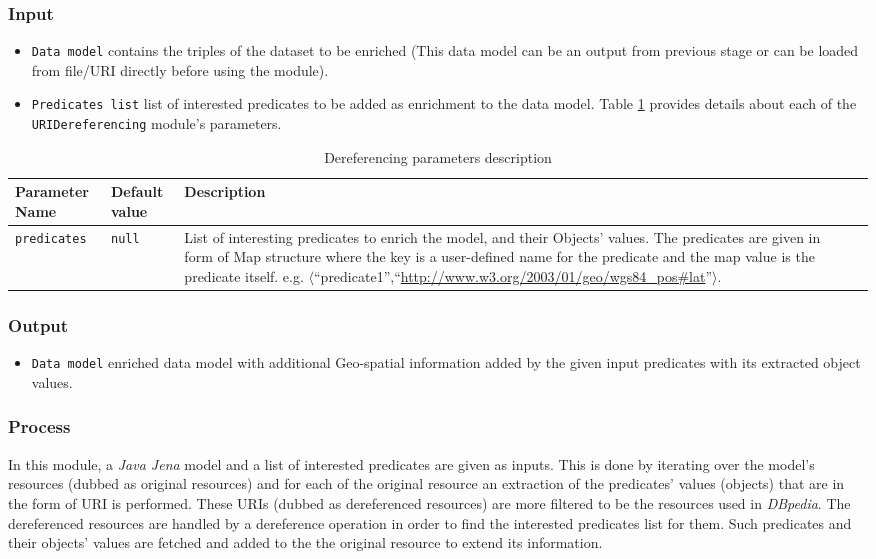 \documentclass[a4paper,twoside,bibtotoc,abstracton,12pt,BCOR=15mm]{article}
\begin{document}
\subsubsection{Input}
\begin{itemize}
 \item \texttt{Data model} contains the triples of the dataset to be enriched 
 (This data model can be an output from previous stage or can be loaded from file/URI directly before using the module). 
 \item \texttt{Predicates list} list of interested predicates to be added as enrichment to the data model.
 Table \ref{tbl:derefPram} provides details about each of the \texttt{URIDereferencing} module's parameters.
\end{itemize}



\begin{table}[ht]
\caption{Dereferencing parameters description} \label{tbl:derefPram}
\begin{tabular}{@{}  l  l p{7cm} l p{6cm}@{}}
\toprule
\textbf{Parameter Name} & \textbf{Default value} & \textbf{Description}\\
\midrule
\texttt{predicates} 	& \texttt{null} 	& List of interesting predicates to enrich the model, and their Objects' values.  The predicates are given in form of Map structure where the key is a user-defined name for the predicate and the map value is the predicate itself. e.g. $\langle$``predicate1'',``\url{http://www.w3.org/2003/01/geo/wgs84_pos#lat}''$\rangle$. \\
\bottomrule
\end{tabular}
\end{table}

\subsubsection{Output}
\begin{itemize}
 \item \texttt{Data model} enriched data model with additional Geo-spatial information added by the given input predicates with its extracted object values.
\end{itemize}

\subsubsection{Process}
 In this module, a \emph{Java Jena} model and a list of interested predicates are given as inputs.
 This is done by iterating over the model's resources (dubbed as original resources) 
 and for each of the original resource an extraction of the predicates' values (objects) that are in the form of URI is performed. 
 These URIs (dubbed as dereferenced resources) are more filtered to be the resources used in \emph{DBpedia}.
 The dereferenced resources are handled by a dereference operation in order to find the interested predicates list for them.
 Such predicates and their objects' values are fetched and added to the the original resource to extend its information.
\end{document}
